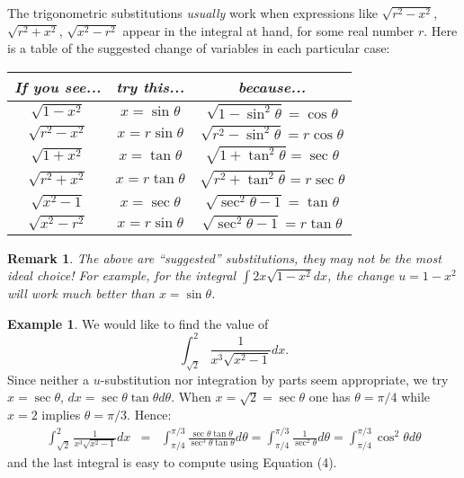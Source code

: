 \documentclass[12pt]{article}
\newtheorem{remark}[thm]{Remark}
\theoremstyle{definition}
\newtheorem{exa}[thm]{Example}
\begin{document}
The trigonometric substitutions {\it usually} work when
expressions like $\sqrt{r^2-x^2}$, $\sqrt{r^2+x^2}$,
$\sqrt{x^2-r^2}$ appear in the integral at hand, for some real
number $r$. Here is a table of the suggested change of variables
in each particular case:\\

\begin{center}
\begin{tabular}{|c|c|c|}
  \hline
  {\it If you see...} & {\it try this...} & {\it because...} \\
  \hline
  $\sqrt{1-x^2}$ & $x=\sin \theta$ & $\sqrt{1-\sin^2\theta}=\cos \theta$ \\
  $\sqrt{r^2-x^2}$ & $x=r\sin\theta$ & $\sqrt{r^2-\sin^2\theta}=r\cos\theta$ \\
  $\sqrt{1+x^2}$ & $x=\tan \theta$ & $\sqrt{1+\tan^2\theta}=\sec \theta$ \\
  $\sqrt{r^2+x^2}$ & $x=r\tan\theta$ & $\sqrt{r^2+\tan^2\theta}=r\sec\theta$ \\
  $\sqrt{x^2-1}$ & $x=\sec \theta$ & $\sqrt{\sec^2\theta-1}=\tan \theta$ \\
  $\sqrt{x^2-r^2}$ & $x=r\sin\theta$ & $\sqrt{\sec^2\theta-1}=r\tan\theta$ \\
  \hline
\end{tabular}
\end{center}

\begin{remark}
The above are ``suggested'' substitutions, they may not be the
most ideal choice! For example, for the integral $\int
2x\sqrt{1-x^2}dx$, the change $u=1-x^2$ will work much better than
$x=\sin \theta$.
\end{remark}

\begin{exa}
We would like to find the value of
$$\int_{\sqrt{2}}^2 \frac{1}{x^3\sqrt{x^2-1}} dx.$$
Since neither a $u$-substitution nor integration by parts seem
appropriate, we try $x=\sec \theta$, $dx=\sec\theta \tan \theta
d\theta$. When $x=\sqrt{2}=\sec\theta$ one has $\theta=\pi/4$
while $x=2$ implies $\theta=\pi/3$. Hence:
\begin{eqnarray*}\int_{\sqrt{2}}^2 \frac{1}{x^3\sqrt{x^2-1}} dx &=&
\int_{\pi/4}^{\pi/3} \frac{\sec\theta \tan\theta}{\sec^3\theta
\tan\theta} d\theta = \int_{\pi/4}^{\pi/3}
\frac{1}{\sec^2\theta}d\theta=\int_{\pi/4}^{\pi/3} \cos^2 \theta
d\theta
\end{eqnarray*}
and the last integral is easy to compute using Equation (4).
\end{exa}
\end{document}
